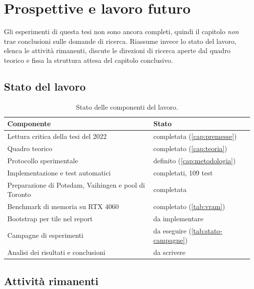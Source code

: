 \chapter{Prospettive e lavoro futuro}
\label{cap:prospettive}

Gli esperimenti di questa tesi non sono ancora completi, quindi il capitolo \emph{non} trae
conclusioni sulle domande di ricerca. Riassume invece lo stato del lavoro, elenca le attività
rimanenti, discute le direzioni di ricerca aperte dal quadro teorico e fissa la struttura attesa
del capitolo conclusivo.

\section{Stato del lavoro}
\label{sec:stato-lavoro}

\begin{table}[H]
  \centering
  \small
  \caption[Stato del lavoro]{Stato delle componenti del lavoro.}
  \label{tab:stato-lavoro}
  \begin{tabular}{|p{5.6cm}|l|}
    \hline
    \textbf{Componente} & \textbf{Stato} \\
    \hline
    Lettura critica della tesi del 2022 & completata (\cref{cap:premesse}) \\
    Quadro teorico & completato (\cref{cap:teoria}) \\
    Protocollo sperimentale & definito (\cref{cap:metodologia}) \\
    Implementazione e test automatici & completati, 109 test \\
    Preparazione di Potsdam, Vaihingen e pool di Toronto & completata \\
    Benchmark di memoria su RTX 4060 & completato (\cref{tab:vram}) \\
    Bootstrap per tile nel report & da implementare \\
    Campagne di esperimenti & da eseguire (\cref{tab:stato-campagne}) \\
    Analisi dei risultati e conclusioni & da scrivere \\
    \hline
  \end{tabular}
\end{table}

\section{Attività rimanenti}
\label{sec:attivita}

